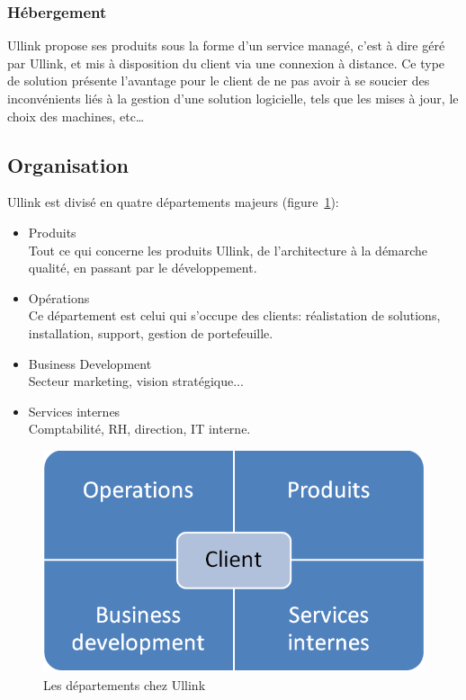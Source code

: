 \documentclass[a4paper, 12pt]{article}
\begin{document}
\subsubsection{Hébergement}

Ullink propose ses produits sous la forme d'un service managé, c'est à dire géré par Ullink, et mis à disposition du client via une connexion à distance. Ce type de solution présente l'avantage pour le client de ne pas avoir à se soucier des inconvénients liés à la gestion d'une solution logicielle, tels que les mises à jour, le choix des machines, etc\dots

\subsection{Organisation}

Ullink est divisé en quatre départements majeurs (figure~\ref{depts_ullink}):

\begin{itemize}
\item Produits\\
Tout ce qui concerne les produits Ullink, de l'architecture à la démarche qualité, en passant par le développement.

\item Opérations\\
Ce département est celui qui s'occupe des clients: réalistation de solutions, installation, support, gestion de portefeuille.

\item Business Development\\
Secteur marketing, vision stratégique...

\item Services internes\\
Comptabilité, RH, direction, IT interne.
\end{itemize}

\begin{figure}
\includegraphics[width=\textwidth]{orga_deps_client.png}
\caption{Les départements chez Ullink}
\label{depts_ullink}
\end{figure}
\end{document}
